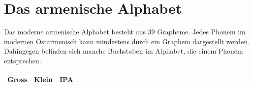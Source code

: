 \documentclass[11pt,a4paper,headsepline,twoside,toc=bibliography]{scrreprt}
\begin{document}
\newpage

\section{Das armenische Alphabet}
\label{appendix:alphabeth_am}

Das moderne armenische Alphabet besteht aus 39 Grapheme. Jedes Phonem im modernen Ostarmenisch kann mindestens durch ein Graphem dargestellt werden. Dahingegen befinden sich manche Buchstaben im Alphabet, die einem Phonem entsprechen. \\    

{
\renewcommand{\arraystretch}{1.2}
\centering
\begin{minipage}{0.5\textwidth}
\begin{tabular}{@{}|l|l|l|}
	
\toprule
	
\textbf{Gross} & \textbf{Klein} & \textbf{IPA} \\
	
\midrule
		

\end{tabular}
\end{minipage}}
\end{document}
